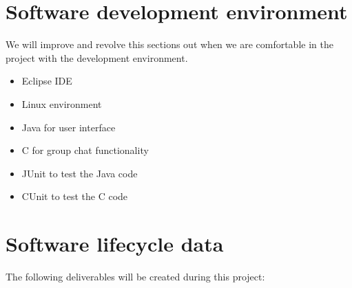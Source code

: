 \documentclass[a4paper]{article}
\begin{document}

\section{Software development environment}

We will improve and revolve this sections out when we are comfortable in the project with the development environment.

\begin{itemize}
	\item Eclipse IDE
	\item Linux environment
	\item Java for user interface
	\item C for group chat functionality
	\item JUnit to test the Java code
	\item CUnit to test the C code
\end{itemize}


\section{Software lifecycle data}

The following deliverables will be created during this project:
\end{document}
